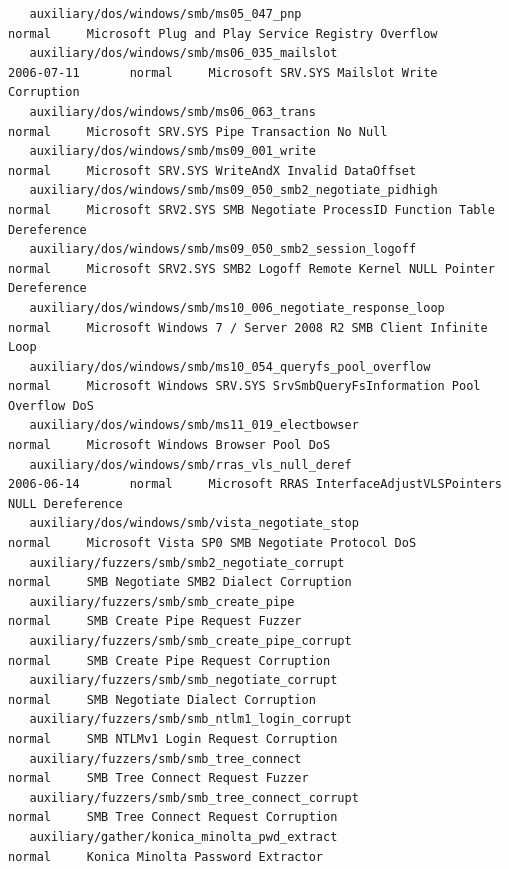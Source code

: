\documentclass[10pt,a4paper]{report}
\begin{document}
\begin{lstlisting}
   auxiliary/dos/windows/smb/ms05_047_pnp                                           normal     Microsoft Plug and Play Service Registry Overflow
   auxiliary/dos/windows/smb/ms06_035_mailslot                     2006-07-11       normal     Microsoft SRV.SYS Mailslot Write Corruption
   auxiliary/dos/windows/smb/ms06_063_trans                                         normal     Microsoft SRV.SYS Pipe Transaction No Null
   auxiliary/dos/windows/smb/ms09_001_write                                         normal     Microsoft SRV.SYS WriteAndX Invalid DataOffset
   auxiliary/dos/windows/smb/ms09_050_smb2_negotiate_pidhigh                        normal     Microsoft SRV2.SYS SMB Negotiate ProcessID Function Table Dereference
   auxiliary/dos/windows/smb/ms09_050_smb2_session_logoff                           normal     Microsoft SRV2.SYS SMB2 Logoff Remote Kernel NULL Pointer Dereference
   auxiliary/dos/windows/smb/ms10_006_negotiate_response_loop                       normal     Microsoft Windows 7 / Server 2008 R2 SMB Client Infinite Loop
   auxiliary/dos/windows/smb/ms10_054_queryfs_pool_overflow                         normal     Microsoft Windows SRV.SYS SrvSmbQueryFsInformation Pool Overflow DoS
   auxiliary/dos/windows/smb/ms11_019_electbowser                                   normal     Microsoft Windows Browser Pool DoS
   auxiliary/dos/windows/smb/rras_vls_null_deref                   2006-06-14       normal     Microsoft RRAS InterfaceAdjustVLSPointers NULL Dereference
   auxiliary/dos/windows/smb/vista_negotiate_stop                                   normal     Microsoft Vista SP0 SMB Negotiate Protocol DoS
   auxiliary/fuzzers/smb/smb2_negotiate_corrupt                                     normal     SMB Negotiate SMB2 Dialect Corruption
   auxiliary/fuzzers/smb/smb_create_pipe                                            normal     SMB Create Pipe Request Fuzzer
   auxiliary/fuzzers/smb/smb_create_pipe_corrupt                                    normal     SMB Create Pipe Request Corruption
   auxiliary/fuzzers/smb/smb_negotiate_corrupt                                      normal     SMB Negotiate Dialect Corruption
   auxiliary/fuzzers/smb/smb_ntlm1_login_corrupt                                    normal     SMB NTLMv1 Login Request Corruption
   auxiliary/fuzzers/smb/smb_tree_connect                                           normal     SMB Tree Connect Request Fuzzer
   auxiliary/fuzzers/smb/smb_tree_connect_corrupt                                   normal     SMB Tree Connect Request Corruption
   auxiliary/gather/konica_minolta_pwd_extract                                      normal     Konica Minolta Password Extractor

\end{lstlisting}
\end{document}
